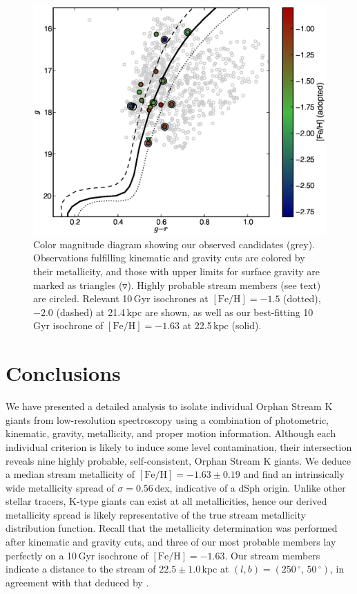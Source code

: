 \documentclass[10pt,apjl]{emulateapj}
\begin{document}
\begin{figure}[h!]
	\includegraphics[width=\columnwidth]{./fig4.eps}
	\caption{Color magnitude diagram showing our observed candidates (grey). Observations fulfilling kinematic and gravity cuts are colored by their metallicity, and those with upper limits for surface gravity are marked as triangles ($\triangledown$). Highly probable stream members (see text) are circled. Relevant 10\,Gyr \citet{Girardi_et-al_2008} isochrones at $[\mbox{Fe/H}] = -1.5$ (dotted), $-2.0$ (dashed) at 21.4\,kpc \citep{Newberg_et-al_2010} are shown, as well as our best-fitting 10\,Gyr isochrone of $[\mbox{Fe/H}] = -1.63$ at 22.5\,kpc (solid).}
	\label{fig:cmd}
\end{figure}

\newpage

\section{Conclusions}
\label{sec:conclusions}

We have presented a detailed analysis to isolate individual Orphan Stream K giants from low-resolution spectroscopy using a combination of photometric, kinematic, gravity, metallicity, and proper motion information. Although each individual criterion is likely to induce some level contamination, their intersection reveals nine highly probable, self-consistent, Orphan Stream K giants.  We deduce a median stream metallicity of $[\mbox{Fe/H}] = -1.63 \pm 0.19$ and find an intrinsically wide metallicity spread of $\sigma = 0.56$\,dex, indicative of a dSph origin. Unlike other stellar tracers, K-type giants can exist at all metallicities, hence our derived metallicity spread is likely representative of the true stream metallicity distribution function. Recall that the metallicity determination was performed after kinematic and gravity cuts, and three of our most probable members lay perfectly on a 10\,Gyr isochrone of $[\mbox{Fe/H}] = -1.63$. Our stream members indicate a distance to the stream of $22.5 \pm 1.0$\,kpc at $(l, b) = (250\,^\circ,\,50\,^\circ)$, in agreement with that deduced by \citet{Newberg_et-al_2010}.
\end{document}
